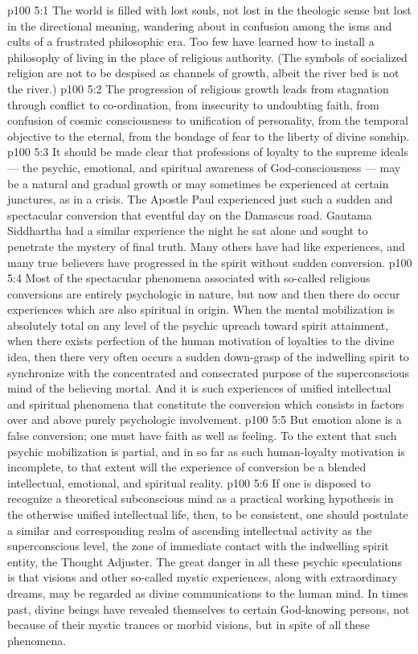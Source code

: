 \vs p100 5:1 The world is filled with lost souls, not lost in the theologic sense but lost in the directional meaning, wandering about in confusion among the isms and cults of a frustrated philosophic era. Too few have learned how to install a philosophy of living in the place of religious authority. (The symbols of socialized religion are not to be despised as channels of growth, albeit the river bed is not the river.)
\vs p100 5:2 The progression of religious growth leads from stagnation through conflict to co\hyp{}ordination, from insecurity to undoubting faith, from confusion of cosmic consciousness to unification of personality, from the temporal objective to the eternal, from the bondage of fear to the liberty of divine sonship.
\vs p100 5:3 \pc It should be made clear that professions of loyalty to the supreme ideals --- the psychic, emotional, and spiritual awareness of God\hyp{}consciousness --- may be a natural and gradual growth or may sometimes be experienced at certain junctures, as in a crisis. The Apostle Paul experienced just such a sudden and spectacular conversion that eventful day on the Damascus road. Gautama Siddhartha had a similar experience the night he sat alone and sought to penetrate the mystery of final truth. Many others have had like experiences, and many true believers have progressed in the spirit without sudden conversion.
\vs p100 5:4 Most of the spectacular phenomena associated with so\hyp{}called religious conversions are entirely psychologic in nature, but now and then there do occur experiences which are also spiritual in origin. When the mental mobilization is absolutely total on any level of the psychic upreach toward spirit attainment, when there exists perfection of the human motivation of loyalties to the divine idea, then there very often occurs a sudden down\hyp{}grasp of the indwelling spirit to synchronize with the concentrated and consecrated purpose of the superconscious mind of the believing mortal. And it is such experiences of unified intellectual and spiritual phenomena that constitute the conversion which consists in factors over and above purely psychologic involvement.
\vs p100 5:5 But emotion alone is a false conversion; one must have faith as well as feeling. To the extent that such psychic mobilization is partial, and in so far as such human\hyp{}loyalty motivation is incomplete, to that extent will the experience of conversion be a blended intellectual, emotional, and spiritual reality.
\vs p100 5:6 \pc If one is disposed to recognize a theoretical subconscious mind as a practical working hypothesis in the otherwise unified intellectual life, then, to be consistent, one should postulate a similar and corresponding realm of ascending intellectual activity as the superconscious level, the zone of immediate contact with the indwelling spirit entity, the Thought Adjuster. The great danger in all these psychic speculations is that visions and other so\hyp{}called mystic experiences, along with extraordinary dreams, may be regarded as divine communications to the human mind. In times past, divine beings have revealed themselves to certain God\hyp{}knowing persons, not because of their mystic trances or morbid visions, but in spite of all these phenomena.
